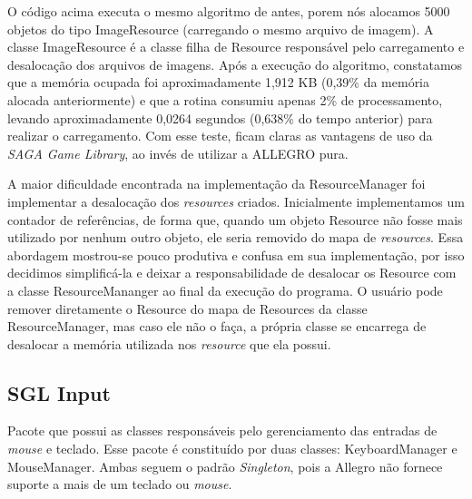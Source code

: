 %
\par O código acima executa o mesmo algoritmo de antes, porem nós alocamos 5000 objetos do tipo ImageResource (carregando o mesmo arquivo de imagem). A classe ImageResource é a classe filha de Resource responsável pelo carregamento e desalocação dos arquivos de imagens. Após a execução do algoritmo, constatamos que a memória ocupada foi aproximadamente 1,912 KB (0,39\% da memória alocada anteriormente) e que a rotina consumiu apenas 2\% de processamento, levando aproximadamente 0,0264 segundos (0,638\% do tempo anterior) para realizar o carregamento. Com esse teste, ficam claras as vantagens de uso da \textit{SAGA Game Library}, ao invés de utilizar a ALLEGRO pura.
\par
A maior dificuldade encontrada na implementação da ResourceManager foi implementar a desalocação dos \textit{resources} criados. Inicialmente implementamos um contador de referências, de forma que, quando um objeto Resource não fosse mais utilizado por nenhum outro objeto, ele seria removido do mapa de \textit{resources}. Essa abordagem mostrou-se pouco produtiva e confusa em sua implementação, por isso decidimos simplificá-la e deixar a responsabilidade de desalocar os Resource com a classe ResourceMananger ao final da execução do programa. O usuário pode remover diretamente o Resource do mapa de Resources da classe ResourceManager, mas caso ele não o faça, a própria classe se encarrega de desalocar a memória utilizada nos \textit{resource} que ela possui.
%
%
%
\subsection{SGL Input}
%
%
Pacote que possui as classes responsáveis pelo gerenciamento das entradas de \textit{mouse} e teclado. Esse pacote é constituído por duas classes: KeyboardManager e MouseManager. Ambas seguem o padrão \textit{Singleton}, pois a Allegro não fornece suporte a mais de um teclado ou \textit{mouse}.
%
%
